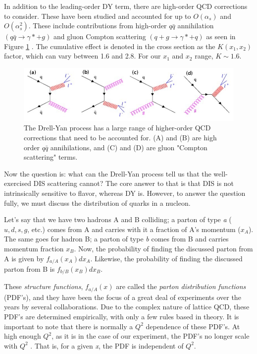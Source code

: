In addition to the leading-order DY term, there are high-order QCD corrections to consider. These have been studied and accounted for up to $O(\alpha_s)$ and $O(\alpha_s^2)$. These include contributions from high-order $q\bar{q}$ annihilation $(q \bar{q} \rightarrow \gamma * + g)$ and gluon Compton scattering $(q + g \rightarrow \gamma * + q)$ as seen in Figure \ref{fig:nlo-dy} \cite{duan-2007-50}. The cumulative effect is denoted in the cross section as the $K(x_1,x_2)$ factor, which can vary between 1.6 and 2.8.  For our $x_1$ and $x_2$ range, $K \sim 1.6$.

\begin{figure}[h]
	\centering
	\includegraphics[width=5.00in]{figures/background/DY.jpeg}
	\caption{The Drell-Yan process has a large range of higher-order QCD corrections that need to be accounted for. 
		(A) and (B) are high order $q\bar{q}$ annihilations, and (C) and (D) are gluon "Compton scattering" terms.}
	\label{fig:nlo-dy}
\end{figure}

Now the question is: what can the Drell-Yan process tell us that the well-exercised DIS scattering cannot? The core answer to that is that DIS is not intrinsically sensitive to flavor, whereas DY is. However, to answer the question fully, we must discuss the distribution of quarks in a nucleon.  

Let's say that we have two hadrons A and B colliding; a parton of type \emph{a} ($u, d, s, g$, etc.) comes from A and carries with it a fraction of A's momentum ($x_A$).  The same goes for hadron B; a parton of type \emph{b} comes from B and carries momentum fraction $x_B$. Now, the probability of finding the discussed parton from A is given by $f_{a/A}(x_A)dx_A$. Likewise, the probability of finding the discussed parton from B is $f_{b/B}(x_B)dx_B$.  

These \emph{structure functions}, $f_{a/A}(x)$ are called the \emph{parton distribution functions} (PDF's), and they have been the focus of a great deal of experiments over the years by several collaborations. Due to the complex nature of lattice QCD, these PDF's are determined empirically, with only a few rules based in theory. It is important to note that there is normally a $Q^2$ dependence of these PDF's. At high enough $Q^2$, as it is in the case of our experiment, the PDF's no longer scale with $Q^2$ \cite{Seely:2009gt}.  That is, for a given \emph{x}, the PDF is independent of $Q^2$.

